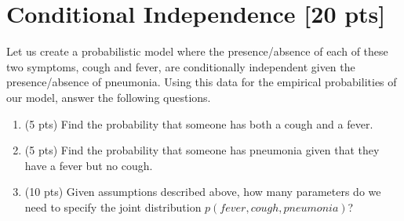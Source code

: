 \documentclass[11pt]{article}
\begin{document}
\pagebreak
\section{Conditional Independence [20 pts]}

Let us create a probabilistic model where the presence/absence of each of these two symptoms, cough and fever, are conditionally independent given the presence/absence of pneumonia. Using this data for the empirical probabilities of our model, answer the following questions.
\begin{enumerate}
\item (5 pts) Find the probability that someone has both a cough and a fever.  \\
\begin{answertext}{6cm}{}


  
\end{answertext} 
\item (5 pts) Find the probability that someone has pneumonia given that they have a fever but no cough.  \\
\begin{answertext}{6cm}{}
\end{answertext} 

\newpage

\item (10 pts) Given assumptions described above, how many parameters do we need to specify the joint distribution $p(fever, cough, pneumonia)$?  \\
\begin{answertext}{6cm}{}
\end{answertext} 
\end{enumerate}


\pagebreak
\end{document}
